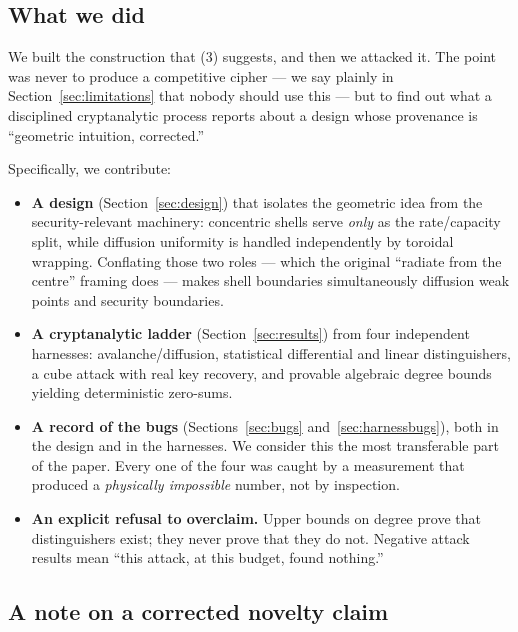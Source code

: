 \documentclass[11pt,a4paper]{article}
\theoremstyle{plain}
\theoremstyle{definition}
\theoremstyle{remark}
\begin{document}
\subsection{What we did}

We built the construction that (3) suggests, and then we attacked it. The point was
never to produce a competitive cipher --- we say plainly in
Section~\ref{sec:limitations} that nobody should use this --- but to find out what a
disciplined cryptanalytic process reports about a design whose provenance is
``geometric intuition, corrected.''

Specifically, we contribute:

\begin{itemize}
  \item \textbf{A design} (Section~\ref{sec:design}) that isolates the geometric idea
    from the security-relevant machinery: concentric shells serve \emph{only} as the
    rate/capacity split, while diffusion uniformity is handled independently by
    toroidal wrapping. Conflating those two roles --- which the original ``radiate
    from the centre'' framing does --- makes shell boundaries simultaneously diffusion
    weak points and security boundaries.
  \item \textbf{A cryptanalytic ladder} (Section~\ref{sec:results}) from four
    independent harnesses: avalanche/diffusion, statistical differential and linear
    distinguishers, a cube attack with real key recovery, and provable algebraic
    degree bounds yielding deterministic zero-sums.
  \item \textbf{A record of the bugs} (Sections~\ref{sec:bugs} and~\ref{sec:harnessbugs}),
    both in the design and in the harnesses. We consider this the most transferable
    part of the paper. Every one of the four was caught by a measurement that produced
    a \emph{physically impossible} number, not by inspection.
  \item \textbf{An explicit refusal to overclaim.} Upper bounds on degree prove that
    distinguishers exist; they never prove that they do not. Negative attack results
    mean ``this attack, at this budget, found nothing.''
\end{itemize}

\subsection{A note on a corrected novelty claim}
\label{sec:novelty}
\end{document}
